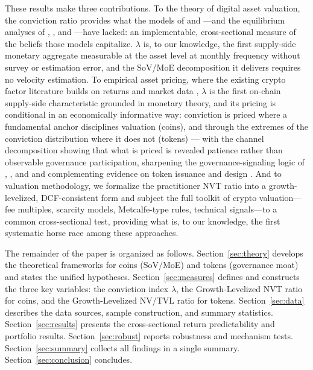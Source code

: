 \documentclass[12pt]{article}
\begin{document}
These results make three contributions. To the theory of digital asset valuation, the
conviction ratio provides what the models of \citet{cong2021tokenomics} and
\citet{sockin2020model}---and the equilibrium analyses of
\citet{pagnotta2022equilibrium}, \citet{biais2019blockchain}, and
\citet{schilling2019bitcoin}---have lacked: an implementable, cross-sectional measure
of the beliefs those models capitalize. $\lambda$ is, to our knowledge, the first
supply-side monetary aggregate measurable at the asset level at monthly frequency
without survey or estimation error, and the SoV/MoE decomposition it delivers requires
no velocity estimation. To empirical asset pricing, where the existing crypto factor
literature builds on returns and market data \citep{liu2021risks, liu2022common,
makarov2020trading}, $\lambda$ is the first on-chain supply-side characteristic
grounded in monetary theory, and its pricing is conditional in an economically
informative way: conviction is priced where a fundamental anchor disciplines valuation
(coins), and through the extremes of the conviction distribution where it does not
(tokens) --- with the channel decomposition showing that what is priced is revealed
patience rather than observable governance participation, sharpening the
governance-signaling logic of \citet{hirschman1970exit}, \citet{edmans2011governance},
and \citet{spence1973job} and complementing evidence on token issuance and design
\citep{howell2020initial, chod2021theory}. And to valuation methodology, we formalize
the practitioner NVT ratio into a growth-levelized, DCF-consistent form and subject
the full toolkit of crypto valuation---fee multiples, scarcity models, Metcalfe-type
rules, technical signals---to a common cross-sectional test, providing what is, to our
knowledge, the first systematic horse race among these approaches.

The remainder of the paper is organized as follows. Section~\ref{sec:theory} develops
the theoretical frameworks for coins (SoV/MoE) and tokens (governance moat) and states
the unified hypotheses. Section~\ref{sec:measures} defines and constructs the three
key variables: the conviction index $\lambda$, the Growth-Levelized NVT ratio for coins,
and the Growth-Levelized NV/TVL ratio for tokens. Section~\ref{sec:data} describes the data sources,
sample construction, and summary statistics. Section~\ref{sec:results} presents the
cross-sectional return predictability and portfolio results. Section~\ref{sec:robust}
reports robustness and mechanism tests. Section~\ref{sec:summary} collects all
findings in a single summary. Section~\ref{sec:conclusion} concludes.
\end{document}
